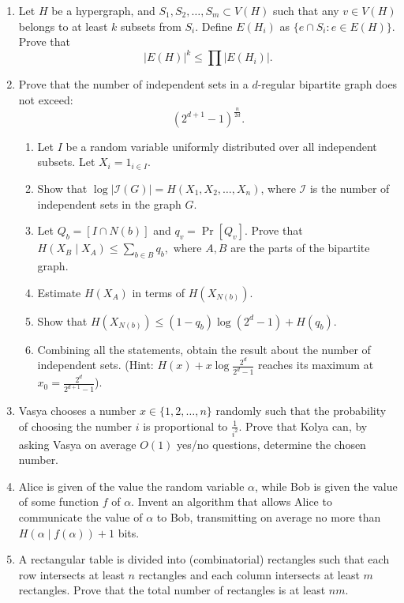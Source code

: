 \documentclass[a4paper]{article}
\begin{document}
\begin{enumerate}
\item Let $H$ be a hypergraph, and $S_1, S_2, \dots, S_m \subset V(H)$ such that any $v \in V(H)$ belongs to at least $k$ subsets from $S_i$. Define $E(H_i)$ as $\{ e \cap S_i: e \in E(H) \}$. Prove that $$|E(H)|^k \leq \prod |E(H_i)|.$$

\item Prove that the number of independent sets in a $d$-regular bipartite graph does not exceed:
$$ (2^{d+1} - 1)^{\frac{n}{2d}}.$$

\begin{enumerate}
\item Let $I$ be a random variable uniformly distributed over all independent subsets. Let $X_i = 1_{i \in I}$.
\item Show that $\log|\mathcal{I}(G)| = H(X_1, X_2, \dots, X_n)$, where $\mathcal{I}$ is the number of independent sets in the graph $G$.
\item Let $Q_b = [I \cap N(b)]$ and $q_v = \Pr[Q_v]$. Prove that $H(X_B \mid X_A) \leq \sum_{b \in B} q_b,$ where $A, B$ are the parts of the bipartite graph.
\item Estimate $H(X_A)$ in terms of $H(X_{N(b)})$.
\item Show that $H(X_{N(b)}) \leq (1 - q_b) \log(2^d - 1) + H(q_b).$
\item Combining all the statements, obtain the result about the number of independent sets. (Hint: $H(x) + x \log \frac{2^d}{2^d - 1}$ reaches its maximum at $x_0 = \frac{2^d}{2^{d+1} - 1}$).
\end{enumerate}

\item Vasya chooses a number $x \in \{1, 2, \dots, n\}$ randomly such that the probability of choosing the number $i$ is proportional to $\frac{1}{i^2}$. Prove that Kolya can, by asking Vasya on average $O(1)$ yes/no questions, determine the chosen number.

\item Alice is given of the value the random variable $\alpha$, while Bob is given the value of some function $f$ of $\alpha$. Invent an algorithm that allows Alice to communicate the value of $\alpha$ to Bob, transmitting on average no more than $H(\alpha \mid f(\alpha)) + 1$ bits.

\item A rectangular table is divided into (combinatorial) rectangles such that each row intersects at least \(n\) rectangles and each column intersects at least \(m\) rectangles. Prove that the total number of rectangles is at least \(nm\).


\end{enumerate}
\end{document}
